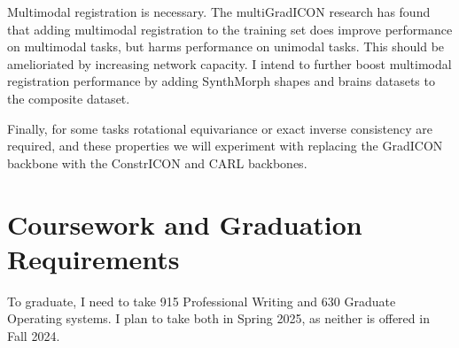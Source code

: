 \documentclass{article}
\begin{document}
Multimodal registration is necessary. The multiGradICON research has found that adding multimodal registration to the training set does improve performance on multimodal tasks, but harms performance on unimodal tasks. This should be amelioriated by increasing network capacity. I intend to further boost multimodal registration performance by adding SynthMorph shapes and brains datasets to the composite dataset.

Finally, for some tasks rotational equivariance or exact inverse consistency are required, and these properties
we will experiment with replacing the GradICON backbone with the ConstrICON and CARL backbones.

\section{Coursework and Graduation Requirements}
To graduate, I need to take 915 Professional Writing and 630 Graduate Operating systems. I plan to take both in Spring 2025, as neither is offered in Fall 2024.








\end{document}
